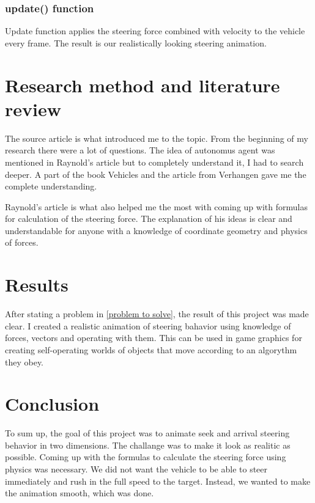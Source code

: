 \documentclass[10pt,twoside,english,a4paper]{article}
\begin{document}
\subsubsection{update() function} \label{updatef} 

Update function applies the steering force combined with velocity to the vehicle
every frame. The result is our realistically looking steering animation. 

\section{Research method and literature review} \label{research method} 

The source article \cite{Raynolds} is what introduced me to the topic. 
From the beginning of my research there were a lot of questions. 
The idea of autonomus agent was mentioned in Raynold's article
but to completely understand it, I had to search deeper. A part of the book Vehicles 
\cite{Braitenberg} and the article from Verhangen \cite{Verhagen} gave me the complete
understanding. 

Raynold's article is what also helped me the most with coming up with formulas for
calculation of the steering force. The explanation of his ideas is clear and 
understandable for anyone with a knowledge of coordinate geometry 
and physics of forces. 

\section{Results} \label{results} 

After stating a problem in \ref{problem to solve}, the result of this 
project was made clear. I created a realistic animation of steering bahavior
using knowledge of forces, vectors and operating with them. 
This can be used in game graphics for creating self-operating worlds
of objects that move according to an algorythm they obey. 

\section{Conclusion} \label{conclusion}

To sum up, the goal of this project was to animate seek and arrival 
steering behavior in two dimensions. The challange was to 
make it look as realitic as possible. Coming 
up with the formulas to calculate the steering force using 
physics was necessary. We did not want the vehicle to be able to 
steer immediately and rush in the full speed to the target. Instead, 
we wanted to make the animation smooth, which was done. 
\end{document}
